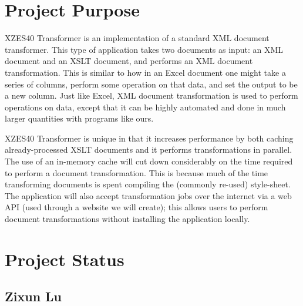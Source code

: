 \section{Project Purpose}

XZES40 Transformer is an implementation of a standard XML document transformer.
This type of application takes two documents as input: an XML document and an XSLT document, and performs an XML document transformation.
This is similar to how in an Excel document one might take a series of columns, perform some operation on that data, and set the output to be a new column.
Just like Excel, XML document transformation is used to perform operations on data, except that it can be highly automated and done in much larger quantities with programs like ours.

XZES40 Transformer is unique in that it increases performance by both caching already-processed XSLT documents and it performs transformations in parallel.
The use of an in-memory cache will cut down considerably on the time required to perform a document transformation.
This is because much of the time transforming documents is spent compiling the (commonly re-used) style-sheet.
The application will also accept transformation jobs over the internet via a web API (used through a website we will create); this allows users to perform document transformations without installing the application locally.

\section{Project Status}

\subsection{Zixun Lu}

